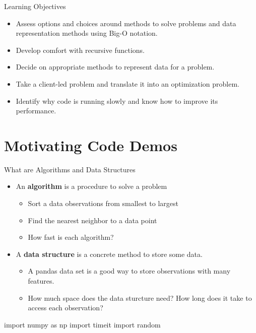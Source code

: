 \documentclass[
  ignorenonframetext,
]{beamer}
\newenvironment{Shaded}{\begin{snugshade}}{\end{snugshade}}
\newcommand{\ImportTok}[1]{\textcolor[rgb]{0.00,0.46,0.62}{#1}}
\newcommand{\NormalTok}[1]{\textcolor[rgb]{0.00,0.23,0.31}{#1}}
\begin{document}
\begin{frame}{Learning Objectives}
\protect\hypertarget{learning-objectives}{}
\begin{itemize}
\item
  Assess options and choices around methods to solve problems and data
  representation methods using Big-O notation.
\item
  Develop comfort with recursive functions.
\item
  Decide on appropriate methods to represent data for a problem.
\item
  Take a client-led problem and translate it into an optimization
  problem.
\item
  Identify why code is running slowly and know how to improve its
  performance.
\end{itemize}
\end{frame}

\hypertarget{motivating-code-demos}{%
\section{Motivating Code Demos}\label{motivating-code-demos}}

\begin{frame}[fragile]{What are Algorithms and Data Structures}
\protect\hypertarget{what-are-algorithms-and-data-structures}{}
\begin{itemize}
\item
  An \textbf{algorithm} is a procedure to solve a problem

  \begin{itemize}
  \item
    Sort a data observations from smallest to largest
  \item
    Find the nearest neighbor to a data point
  \item
    How fast is each algorithm?
  \end{itemize}
\item
  A \textbf{data structure} is a concrete method to store some data.

  \begin{itemize}
  \item
    A pandas data set is a good way to store observations with many
    features.
  \item
    How much space does the data sturcture need? How long does it take
    to access each observation?
  \end{itemize}
\end{itemize}

\begin{Shaded}
\begin{Highlighting}[]
\ImportTok{import}\NormalTok{ numpy }\ImportTok{as}\NormalTok{ np}
\ImportTok{import}\NormalTok{ timeit}
\ImportTok{import}\NormalTok{ random}
\end{Highlighting}
\end{Shaded}
\end{frame}
\end{document}
